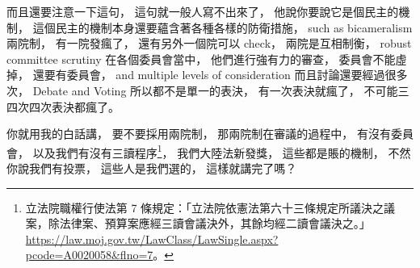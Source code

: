 \hypertarget{w06:cue:1372}{}而且還要注意一下這句，
\hypertarget{w06:cue:1373}{}這句就一般人寫不出來了，
\hypertarget{w06:cue:1374}{}他說你要說它是個民主的機制，
\hypertarget{w06:cue:1375}{}這個民主的機制本身還要蘊含著各種各樣的防衛措施，
\hypertarget{w06:cue:1376}{}such as bicameralism
\hypertarget{w06:cue:1377}{}兩院制，
\hypertarget{w06:cue:1378}{}有一院發瘋了，
\hypertarget{w06:cue:1379}{}還有另外一個院可以 check，
\hypertarget{w06:cue:1380}{}兩院是互相制衡，
\hypertarget{w06:cue:1381}{}robust committee scrutiny
\hypertarget{w06:cue:1382}{}在各個委員會當中，
\hypertarget{w06:cue:1383}{}他們進行強有力的審查，
\hypertarget{w06:cue:1384}{}委員會不能虛掉，
\hypertarget{w06:cue:1385}{}還要有委員會，
\hypertarget{w06:cue:1386}{}and multiple levels of consideration
\hypertarget{w06:cue:1387}{}而且討論還要經過很多次，
\hypertarget{w06:cue:1388}{}Debate and Voting
\hypertarget{w06:cue:1389}{}所以都不是單一的表決，
\hypertarget{w06:cue:1390}{}有一次表決就瘋了，
\hypertarget{w06:cue:1391}{}不可能三四次四次表決都瘋了。

\hypertarget{w06:cue:1392}{}你就用我的白話講，
\hypertarget{w06:cue:1393}{}要不要採用兩院制，
\hypertarget{w06:cue:1394}{}那兩院制在審議的過程中，
\hypertarget{w06:cue:1395}{}有沒有委員會，
\hypertarget{w06:cue:1396}{}以及我們有沒有三讀程序\footnote{立法院職權行使法第 7 條規定：「立法院依憲法第六十三條規定所議決之議案，除法律案、預算案應經三讀會議決外，其餘均經二讀會議決之。」\url{https://law.moj.gov.tw/LawClass/LawSingle.aspx?pcode=A0020058&flno=7}。}，
\hypertarget{w06:cue:1397}{}我們大陸法新發獎，
\hypertarget{w06:cue:1398}{}這些都是賬的機制，
\hypertarget{w06:cue:1399}{}不然你說我們有投票，
\hypertarget{w06:cue:1400}{}這些人是我們選的，
\hypertarget{w06:cue:1401}{}這樣就講完了嗎？

